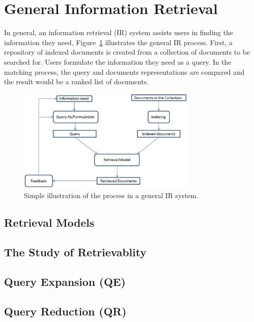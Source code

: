 \section{General Information Retrieval}
In general, an information retrieval (IR) system assists users in finding the information they need, Figure~\ref{fig:generalir} illustrates the general IR process. First, a repository of indexed documents is created from a collection of documents to be searched for. Users formulate the information they need as a query. In the matching process, the query and documents representations are compared and the result would be a ranked list of documents.  
\begin{figure}[htpb]
   \centering
   \includegraphics[width=.60\textwidth,height=50mm]{figs/generalIR.jpg}
   \caption{Simple illustration of the process in a general IR system.}  
   \label{fig:generalir} 
\end{figure}
\FloatBarrier 
\subsection{Retrieval Models}
\label{subsub:retmodels}


\subsection{The Study of Retrievablity}

\label{subsub:retrievability}

\subsection{Query Expansion (QE)}


\subsection{Query Reduction (QR)}

%


